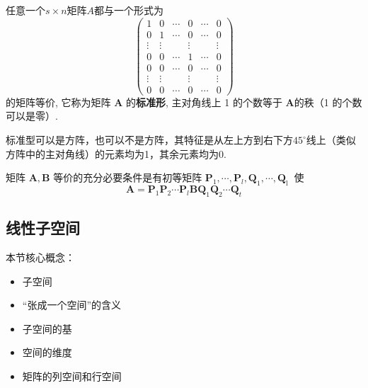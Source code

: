\begin{theorem}[任何矩阵都等价于一个同尺寸的标准型]
    任意一个$s\times n$矩阵$A$都与一个形式为
    \begin{equation*}
    \left(\begin{array}{cccccc}1 & 0 & \cdots & 0 & \cdots & 0 \\ 0 & 1 & \cdots & 0 & \cdots & 0 \\ \vdots & \vdots & & \vdots & & \vdots \\ 0 & 0 & \cdots & 1 & \cdots & 0 \\ 0 & 0 & \cdots & 0 & \cdots & 0 \\ \vdots & \vdots & & \vdots & & \vdots \\ 0 & 0 & \cdots & 0 & \cdots & 0\end{array}\right)
    \end{equation*}
    的矩阵等价, 它称为矩阵 $\boldsymbol{A}$ 的\textcolor{third}{\bf 标准形}, 主对角线上 1 的个数等于 $\boldsymbol{A}$的秩（1 的个数可以是零）.
\end{theorem}

\begin{note}
    标准型可以是方阵，也可以不是方阵，其特征是从左上方到右下方$45^\circ$线上（类似方阵中的主对角线）的元素均为1，其余元素均为0.
\end{note}

\begin{theorem}
矩阵 $\boldsymbol{A}, \boldsymbol{B}$ 等价的充分必要条件是有初等矩阵 $\boldsymbol{P}_1, \cdots, \boldsymbol{P}_l, \boldsymbol{Q}_1, \cdots, \boldsymbol{Q}_{\text {l }}$ 使
\begin{equation*}
\boldsymbol{A}=\boldsymbol{P}_1 \boldsymbol{P}_2 \cdots \boldsymbol{P}_l \boldsymbol{B} \boldsymbol{Q}_1 \boldsymbol{Q}_2 \cdots \boldsymbol{Q}_t 
\end{equation*}
\end{theorem}

\subsection{线性子空间}
\label{subsec:线性子空间}

\begin{note}
    本节核心概念：
    \begin{itemize}
        \item 子空间
        \item “张成一个空间”的含义
        \item 子空间的基
        \item 空间的维度
        \item 矩阵的列空间和行空间
    \end{itemize}
\end{note}

